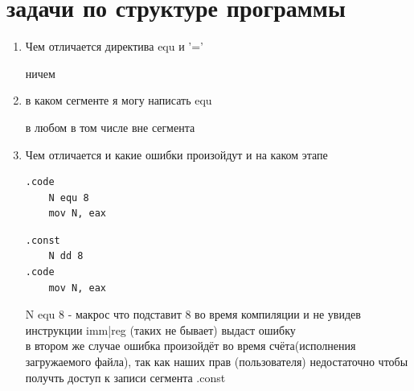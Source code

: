 \documentclass[a4paper,10pt]{article}
\begin{document}
\section*{задачи по структуре программы}
\begin{enumerate}
    \item Чем отличается директива equ и '=' \par
    ничем
    \item в каком сегменте я могу написать equ \par
    в любом в том числе вне сегмента
    \item Чем отличается и какие ошибки произойдут и на каком этапе
    \begin{multicols}{2}
\begin{verbatim}
.code
    N equ 8
    mov N, eax
\end{verbatim}
        \columnbreak
\begin{verbatim}
.const
    N dd 8
.code
    mov N, eax
\end{verbatim} 
    \end{multicols} \par
N equ 8 - макрос что подставит 8 во время компиляции и не увидев инструкции imm|reg (таких не бывает) выдаст ошибку \\
в втором же случае ошибка произойдёт во время счёта(исполнения загружаемого файла), так как наших прав (пользователя) недостаточно чтобы получть доступ к записи сегмента .const \\


\end{enumerate}
\end{document}
